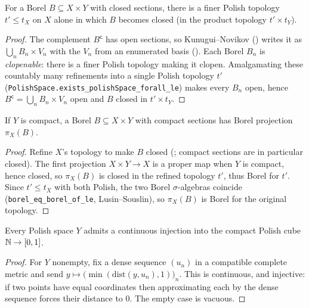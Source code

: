 \begin{theorem}\label{thm:dst-finer-polish}
  \leanok
  For a Borel \(B\subseteq X\times Y\) with closed sections, there is a finer Polish topology
  \(t'\le t_X\) on \(X\) alone in which \(B\) becomes closed (in the product topology \(t'\times
  t_Y\)).
\end{theorem}
\begin{proof}\leanok
  The complement \(B^{\mathsf c}\) has open sections, so Kunugui--Novikov
  () writes it as \(\bigcup_n B_n\times V_n\) with the \(V_n\) from an
  enumerated basis (). Each Borel \(B_n\) is \emph{clopenable}: there is a
  finer Polish topology making it clopen. Amalgamating these countably many refinements into a
  single Polish topology \(t'\) (\texttt{PolishSpace.exists\_polishSpace\_forall\_le}) makes every
  \(B_n\) open, hence \(B^{\mathsf c}=\bigcup_n B_n\times V_n\) open and \(B\) closed in
  \(t'\times t_Y\).
\end{proof}

\begin{theorem}\label{thm:dst-proj-compact}
  \leanok
  If \(Y\) is compact, a Borel \(B\subseteq X\times Y\) with compact sections has Borel projection
  \(\pi_X(B)\).
\end{theorem}
\begin{proof}\leanok
  Refine \(X\)'s topology to make \(B\) closed (; compact sections are
  in particular closed). The first projection \(X\times Y\to X\) is a proper map when \(Y\) is
  compact, hence closed, so \(\pi_X(B)\) is closed in the refined topology \(t'\), thus Borel for
  \(t'\). Since \(t'\le t_X\) with both Polish, the two Borel \(\sigma\)-algebras coincide
  (\texttt{borel\_eq\_borel\_of\_le}, Lusin--Souslin), so \(\pi_X(B)\) is Borel for the original
  topology.
\end{proof}

\begin{lemma}\label{thm:dst-cube}
  \leanok
  Every Polish space \(Y\) admits a continuous injection into the compact Polish cube
  \(\mathbb{N}\to[0,1]\).
\end{lemma}
\begin{proof}\leanok
  For \(Y\) nonempty, fix a dense sequence \((u_n)\) in a compatible complete metric and send
  \(y\mapsto\bigl(\min(\mathrm{dist}(y,u_n),1)\bigr)_n\). This is continuous, and injective: if two
  points have equal coordinates then approximating each by the dense sequence forces their distance
  to \(0\). The empty case is vacuous.
\end{proof}

